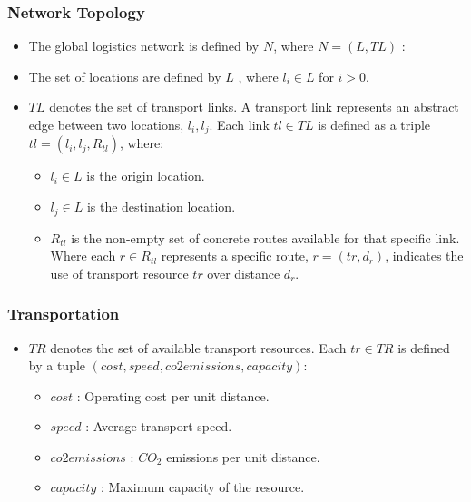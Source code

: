 \documentclass{article}
\begin{document}
\subsubsection{Network Topology}

\begin{itemize}
    \item The global logistics network is defined by $N$, where $N = (L, TL)$ :
    \item The set of locations are defined by $L$ , where $l_i \in L$ for $i >0$.
    \item $TL$ denotes the set of transport links. A transport link represents an abstract edge between two locations, $l_i,l_j$. Each link $tl \in TL$ is defined as a triple $tl = (l_i, l_j, R_{tl})$, where:
    \begin{itemize}
        \item $l_i \in L$ is the origin location.
        \item $l_j \in L$ is the destination location.
        \item $R_{tl}$ is the non-empty set of concrete routes available for that specific link. Where each $r \in R_{tl}$ represents a specific route, $r = (tr,d_r)$, indicates the use of transport resource $tr$ over distance $d_r$.
    \end{itemize}
\end{itemize}

\subsubsection{Transportation}
\begin{itemize}
    \item $TR$ denotes the set of available transport resources. Each $tr \in TR$ is defined by a tuple $(cost, speed, co2emissions, capacity)$:
    \begin{itemize}
        \item $cost$ : Operating cost per unit distance.
        \item $speed$ : Average transport speed.
        \item $co2emissions$ : $CO_2$ emissions per unit distance.
        \item $capacity$ : Maximum capacity of the resource.
    \end{itemize}
\end{itemize}
\end{document}

